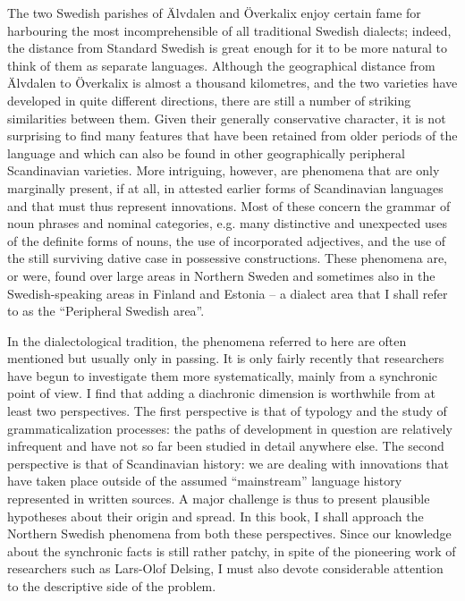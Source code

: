 \begin{styleBodyTextFirst}
The two Swedish parishes of Älvdalen and Överkalix enjoy certain fame for harbouring the most incomprehensible of all traditional Swedish dialects; indeed, the distance from Standard Swedish is great enough for it to be more natural to think of them as separate languages. Although the geographical distance from Älvdalen to Överkalix is almost a thousand kilometres, and the two varieties have developed in quite different directions, there are still a number of striking similarities between them. Given their generally conservative character, it is not surprising to find many features that have been retained from older periods of the language and which can also be found in other geographically peripheral Scandinavian varieties. More intriguing, however, are phenomena that are only marginally present, if at all, in attested earlier forms of Scandinavian languages and that must thus represent innovations. Most of these concern the grammar of noun phrases and nominal categories, e.g. many distinctive and unexpected uses of the definite forms of nouns, the use of incorporated adjectives, and the use of the still surviving dative case in possessive constructions. These phenomena are, or were, found over large areas in Northern Sweden and sometimes also in the Swedish-speaking areas in Finland and Estonia – a dialect area that I shall refer to as the “Peripheral Swedish area”.

\end{styleBodyTextFirst}

\begin{styleBodytextC}
In the dialectological tradition, the phenomena referred to here are often mentioned but usually only in passing. It is only fairly recently that researchers have begun to investigate them more systematically, mainly from a synchronic point of view. I find that adding a diachronic dimension is worthwhile from at least two perspectives. The first perspective is that of typology and the study of grammaticalization processes: the paths of development in question are relatively infrequent and have not so far been studied in detail anywhere else. The second perspective is that of Scandinavian history: we are dealing with innovations that have taken place outside of the assumed “mainstream” language history represented in written sources. A major challenge is thus to present plausible hypotheses about their origin and spread. In this book, I shall approach the Northern Swedish phenomena from both these perspectives. Since our knowledge about the synchronic facts is still rather patchy, in spite of the pioneering work of researchers such as Lars-Olof Delsing, I must also devote considerable attention to the descriptive side of the problem.

\end{styleBodytextC}

